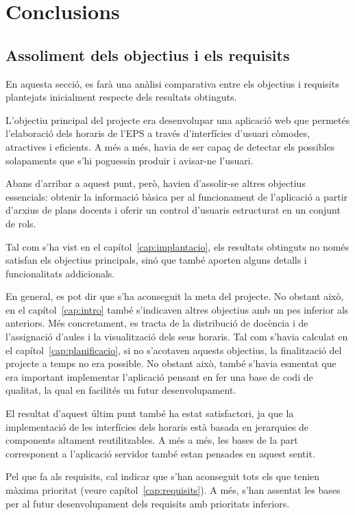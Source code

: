\documentclass[a4paper,12pt]{ThesisStyle}
\begin{document}
\chapter{Conclusions}
\label{cap:conclusions}

\section{Assoliment dels objectius i els requisits}
\label{sec:assoliment_objectius}

En aquesta secció, es farà una anàlisi comparativa entre els objectius i requisits plantejats inicialment respecte dels resultats obtinguts.

L'objectiu principal del projecte era desenvolupar una aplicació web que permetés l'elaboració dels horaris de l'EPS a través d'interfícies d'usuari còmodes, atractives i eficients. A més a més, havia de ser capaç de detectar els possibles solapaments que s'hi poguessin produir i avisar-ne l'usuari.

Abans d'arribar a aquest punt, però, havien d'assolir-se altres objectius essencials: obtenir la informació bàsica per al funcionament de l'aplicació a partir d'arxius de plans docents i oferir un control d'usuaris estructurat en un conjunt de rols.

Tal com s'ha vist en el capítol~\ref{cap:implantacio}, els resultats obtinguts no només satisfan els objectius principals, sinó que també aporten alguns detalls i funcionalitats addicionals.

En general, es pot dir que s'ha aconseguit la meta del projecte. No obstant això, en el capítol~\ref{cap:intro} també s'indicaven altres objectius amb un pes inferior als anteriors. Més concretament, es tracta de la distribució de docència i de l'assignació d'aules i la visualització dels seus horaris. Tal com s'havia calculat en el capítol~\ref{cap:planificacio}, si no s'acotaven aquests objectius, la finalització del projecte a temps no era possible. No obstant això, també s'havia esmentat que era important implementar l'aplicació pensant en fer una base de codi de qualitat, la qual en facilités un futur desenvolupament.

El resultat d'aquest últim punt també ha estat satisfactori, ja que la implementació de les interfícies dels horaris està basada en jerarquies de components altament reutilitzables. A més a més, les bases de la part corresponent a l'aplicació servidor també estan pensades en aquest sentit.

Pel que fa als requisits, cal indicar que s'han aconseguit tots els que tenien màxima prioritat (veure capítol~\ref{cap:requisits}). A més, s'han assentat les bases per al futur desenvolupament dels requisits amb prioritats inferiors.
\end{document}
